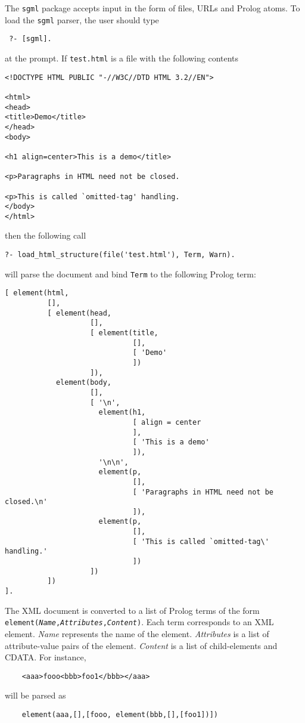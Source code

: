 The {\tt sgml} package accepts
input in the form of files, URLs and Prolog atoms.
To load the {\tt sgml} parser, the user should type
\begin{verbatim}
 ?- [sgml].  
\end{verbatim}
at the prompt.
If {\tt test.html} is a file with the following contents 
\begin{verbatim}
<!DOCTYPE HTML PUBLIC "-//W3C//DTD HTML 3.2//EN">

<html>
<head>
<title>Demo</title>
</head>
<body>

<h1 align=center>This is a demo</title>

<p>Paragraphs in HTML need not be closed.

<p>This is called `omitted-tag' handling.
</body>
</html>
\end{verbatim}
then the following call
\begin{verbatim}
?- load_html_structure(file('test.html'), Term, Warn).
\end{verbatim}
will parse the document and bind {\tt Term} to the following Prolog term: 
\begin{verbatim}
[ element(html,
          [],
          [ element(head,
                    [],
                    [ element(title,
                              [],
                              [ 'Demo'
                              ])
                    ]),
            element(body,
                    [],
                    [ '\n',
                      element(h1,
                              [ align = center
                              ],
                              [ 'This is a demo'
                              ]),
                      '\n\n',
                      element(p,
                              [],
                              [ 'Paragraphs in HTML need not be closed.\n'
                              ]),
                      element(p,
                              [],
                              [ 'This is called `omitted-tag\' handling.'
                              ])
                    ])
          ])
].
\end{verbatim}



\noindent
The XML document is converted to a list of Prolog terms of the form {\tt
  element(\emph{Name},\emph{Attributes},\emph{Content})}.  Each term
corresponds to an XML element. \emph{Name} represents the name of the element.
\emph{Attributes} is a list of attribute-value pairs of the element.  
\emph{Content} is a list of child-elements and CDATA.
For instance, 
\begin{verbatim}
    <aaa>fooo<bbb>foo1</bbb></aaa>  
\end{verbatim}
will be parsed as
\begin{verbatim}
    element(aaa,[],[fooo, element(bbb,[],[foo1])])  
\end{verbatim}


